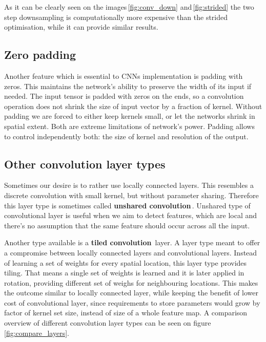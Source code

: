 As it can be clearly seen on the images\,\ref{fig:conv_down} and\,\ref{fig:strided} the two step downsampling is computationally more expensive than the strided optimisation, while it can provide similar results.

\subsection{Zero padding}

Another feature which is essential to CNNs implementation is padding with zeros. This maintains the network's ability to preserve the width of its input if needed. The input tensor is padded with zeros on the ends, so a convolution operation does not shrink the size of input vector by a fraction of kernel. Without padding we are forced to either keep kernels small, or let the networks shrink in spatial extent. Both are extreme limitations of network's power. Padding allows to control independently both: the size of kernel and resolution of the output.

\subsection{Other convolution layer types}

Sometimes our desire is to rather use locally connected layers. This resembles a discrete convolution with small kernel, but without parameter sharing. Therefore this layer type is sometimes called \textbf{unshared convolution}\,\cite{locally_connected}. Unshared type of convolutional layer is useful when we aim to detect features, which are local and there's no assumption that the same feature should occur across all the input.

Another type available is a \textbf{tiled convolution}\,\cite{tiled_conv} layer. A layer type meant to offer a compromise between locally connected layers and convolutional layers. Instead of learning a set of weights for every spatial location, this layer type provides tiling. That means a single set of weights is learned and it is later applied in rotation, providing different set of weighs for neighbouring locations. This makes the outcome similar to locally connected layer, while keeping the benefit of lower cost of convolutional layer, since requirements to store parameters would grow by factor of kernel set size, instead of size of a whole feature map. A comparison overview of different convolution layer types can be seen on figure\,\ref{fig:compare_layers}.

